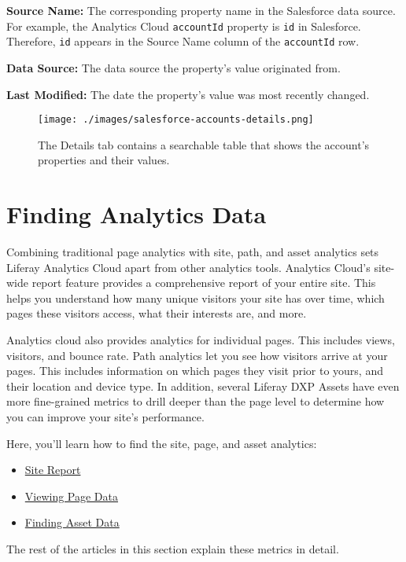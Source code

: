 \textbf{Source Name:} The corresponding property name in the Salesforce
data source. For example, the Analytics Cloud \texttt{accountId}
property is \texttt{id} in Salesforce. Therefore, \texttt{id} appears in
the Source Name column of the \texttt{accountId} row.

\textbf{Data Source:} The data source the property's value originated
from.

\textbf{Last Modified:} The date the property's value was most recently
changed.

\begin{figure}
\centering
\texttt{[image: ./images/salesforce-accounts-details.png]}
\caption{The Details tab contains a searchable table that shows the
account's properties and their values.}
\end{figure}

\chapter{Finding Analytics Data}\label{finding-analytics-data}

Combining traditional page analytics with site, path, and asset
analytics sets Liferay Analytics Cloud apart from other analytics tools.
Analytics Cloud's site-wide report feature provides a comprehensive
report of your entire site. This helps you understand how many unique
visitors your site has over time, which pages these visitors access,
what their interests are, and more.

Analytics cloud also provides analytics for individual pages. This
includes views, visitors, and bounce rate. Path analytics let you see
how visitors arrive at your pages. This includes information on which
pages they visit prior to yours, and their location and device type. In
addition, several Liferay DXP Assets have even more fine-grained metrics
to drill deeper than the page level to determine how you can improve
your site's performance.

Here, you'll learn how to find the site, page, and asset analytics:

\begin{itemize}
\tightlist
\item
  \hyperref[site-report]{Site Report}
\item
  \hyperref[viewing-page-data]{Viewing Page Data}
\item
  \hyperref[finding-asset-data]{Finding Asset Data}
\end{itemize}

The rest of the articles in this section explain these metrics in
detail.

